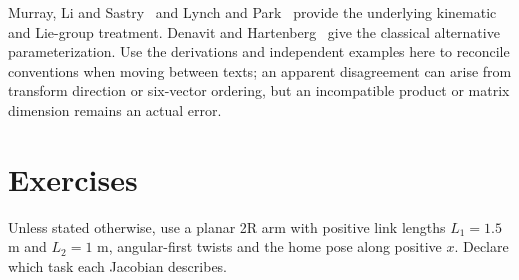 Murray, Li and Sastry~\cite{Murray1994} and Lynch and Park~\cite{Lynch2017} provide the underlying kinematic and Lie-group treatment. Denavit and Hartenberg~\cite{dh1955} give the classical alternative parameterization. Use the derivations and independent examples here to reconcile conventions when moving between texts; an apparent disagreement can arise from transform direction or six-vector ordering, but an incompatible product or matrix dimension remains an actual error.

\section{Exercises}
\label{sec:ch9_exercises}

Unless stated otherwise, use a planar 2R arm with positive link lengths $L_1=1.5$ m and $L_2=1$ m, angular-first twists and the home pose along positive $x$. Declare which task each Jacobian describes.

